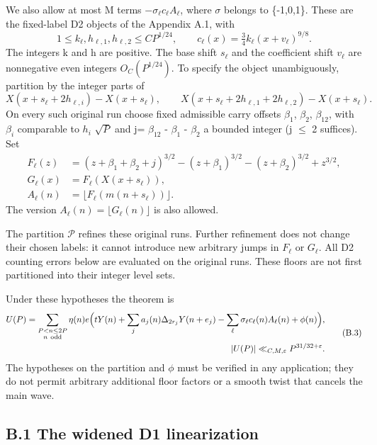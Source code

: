 \documentclass[11pt,a4paper]{article}
\begin{document}
We also allow at most M terms \(-\sigma_\ell c_\ell A_\ell\), where
\(\sigma\) belongs to \{-1,0,1\}. These are the fixed-label D2 objects
of the Appendix A.1, with \[
1\le k_\ell,h_{\ell,1},h_{\ell,2}\le CP^{1/24},
\qquad c_\ell(x)=\tfrac34 k_\ell(x+v_\ell)^{9/8}.
\] The integers k and h are positive. The base shift \(s_\ell\) and the
coefficient shift \(v_\ell\) are nonnegative even integers
\(O_C(P^{1/24})\). To specify the object unambiguously, partition by the
integer parts of \[
X(x+s_\ell+2h_{\ell,i})-X(x+s_\ell),\qquad
X(x+s_\ell+2h_{\ell,1}+2h_{\ell,2})-X(x+s_\ell).
\] On every such original run choose fixed admissible carry offsets
\(\beta_1\), \(\beta_2\), \(\beta_{12}\), with \(\beta_i\) comparable to
\(h_i\) \(\sqrt{P}\) and j= \(\beta_{12}\) - \(\beta_1\) - \(\beta_2\) a
bounded integer (\textbar j\textbar{} \(\le\) 2 suffices). Set \[
\begin{split}
F_\ell(z)&=(z+\beta_1+\beta_2+j)^{3/2}
-(z+\beta_1)^{3/2}-(z+\beta_2)^{3/2}+z^{3/2},\\
G_\ell(x)&=F_\ell(X(x+s_\ell)),\\
A_\ell(n)&=\lfloor F_\ell(m(n+s_\ell))\rfloor.
\end{split}
\] The version \(A_\ell(n)=\lfloor G_\ell(n)\rfloor\) is also allowed.

The partition \(\mathcal P\) refines these original runs. Further
refinement does not change their chosen labels: it cannot introduce new
arbitrary jumps in \(F_\ell\) or \(G_\ell\). All D2 counting errors
below are evaluated on the original runs. These floors are not first
partitioned into their integer level sets.

Under these hypotheses the theorem is \[
\begin{split}
U(P)=\sum_{\substack{P<n\le2P\\n\ {\rm odd}}}\eta(n)e\Big(
tY(n)+\sum_j a_j(n)\Delta_{2r_j}Y(n+e_j)
-\sum_\ell\sigma_\ell c_\ell(n)A_\ell(n)+\phi(n)\Big),\\
|U(P)|\ll_{C,M,\varepsilon}P^{31/32+\varepsilon}.
\end{split}\tag{B.3}
\] The hypotheses on the partition and \(\phi\) must be verified in any
application; they do not permit arbitrary additional floor factors or a
smooth twist that cancels the main wave.

\subsection{B.1 The widened D1
linearization}\label{b.1-the-widened-d1-linearization}
\end{document}
